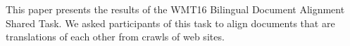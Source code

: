 This paper presents the results of the WMT16 Bilingual Document Alignment Shared Task. We asked participants of this task to align documents that are translations of each other from crawls of web sites.
